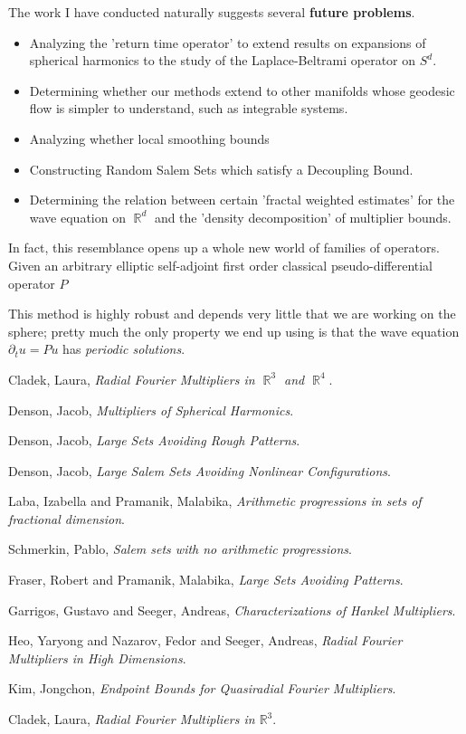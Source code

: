 \documentclass[12pt]{article}
\DeclareMathOperator{\RR}{\mathbb{R}}
\begin{document}
The work I have conducted naturally suggests several {\bf future problems}.
%
\begin{itemize}
	\item Analyzing the 'return time operator' to extend results on expansions of spherical harmonics to the study of the Laplace-Beltrami operator on $S^d$.

	\item Determining whether our methods extend to other manifolds whose geodesic flow is simpler to understand, such as integrable systems.

	\item Analyzing whether local smoothing bounds

	\item Constructing Random Salem Sets which satisfy a Decoupling Bound.

	\item Determining the relation between certain 'fractal weighted estimates' for the wave equation on $\RR^d$ and the 'density decomposition' of multiplier bounds.
\end{itemize}

In fact, this resemblance opens up a whole new world of families of operators. Given an arbitrary elliptic self-adjoint first order classical pseudo-differential operator $P$

This method is highly robust and depends very little that we are working on the sphere; pretty much the only property we end up using is that the wave equation $\partial_t u = P u$ has \emph{periodic solutions}.

\begin{thebibliography}{03}

 Cladek, Laura,
	\emph{Radial {F}ourier Multipliers in $\RR^3$ and $\RR^4$}.

 Denson, Jacob,
	\emph{Multipliers of Spherical Harmonics}.

 Denson, Jacob,
 	\emph{Large Sets Avoiding Rough Patterns}.

 Denson, Jacob,
	\emph{Large Salem Sets Avoiding Nonlinear Configurations}.

 Laba, Izabella and Pramanik, Malabika,
	\emph{Arithmetic progressions in sets of fractional dimension}.

 Schmerkin, Pablo,
	\emph{{S}alem sets with no arithmetic progressions}.

 Fraser, Robert and Pramanik, Malabika,
	\emph{Large Sets Avoiding Patterns}.

 Garrigos, Gustavo and Seeger, Andreas,
	\emph{Characterizations of {H}ankel Multipliers}.

 Heo, Yaryong and Nazarov, Fedor and Seeger, Andreas,
	\emph{Radial {F}ourier Multipliers in High Dimensions}.

 Kim, Jongchon,
	\emph{Endpoint Bounds for Quasiradial {F}ourier Multipliers}.

 Cladek, Laura,
	\emph{Radial {F}ourier Multipliers in $\mathbb{R}^3$}.

\end{thebibliography}
\end{document}
